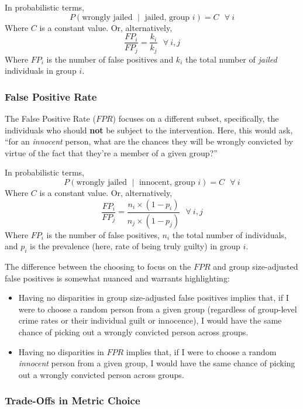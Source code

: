 \documentclass[]{krantz}
\begin{document}
In probabilistic terms,
\[P(\textrm{wrongly jailed $\mid$ jailed, group $i$}) = C~~~\forall~i\]
Where \(C\) is a constant value. Or, alternatively,
\[\frac{FP_i}{FP_j} = \frac{k_i}{k_j}~~~\forall~i,j\] Where \(FP_i\) is
the number of false positives and \(k_i\) the total number of
\emph{jailed} individuals in group \(i\).

\subsubsection{False Positive Rate}\label{false-positive-rate}

The False Positive Rate (\(FPR\)) focuses on a different subset,
specifically, the individuals who should \textbf{not} be subject to the
intervention. Here, this would ask, ``for an \emph{innocent} person,
what are the chances they will be wrongly convicted by virtue of the
fact that they're a member of a given group?''

In probabilistic terms,
\[P(\textrm{wrongly jailed $\mid$ innocent, group $i$}) = C~~~\forall~i\]
Where \(C\) is a constant value. Or, alternatively,
\[\frac{FP_i}{FP_j} = \frac{n_i \times (1-p_i)}{n_j \times (1-p_j)}~~~\forall~i,j\]
Where \(FP_i\) is the number of false positives, \(n_i\) the total
number of individuals, and \(p_i\) is the prevalence (here, rate of
being truly guilty) in group \(i\).

The difference between the choosing to focus on the \(FPR\) and group
size-adjusted false positives is somewhat nuanced and warrants
highlighting:

\begin{itemize}
\item
  Having no disparities in group size-adjusted false positives implies
  that, if I were to choose a random person from a given group
  (regardless of group-level crime rates or their individual guilt or
  innocence), I would have the same chance of picking out a wrongly
  convicted person across groups.
\item
  Having no disparities in \(FPR\) implies that, if I were to choose a
  random \emph{innocent} person from a given group, I would have the
  same chance of picking out a wrongly convicted person across groups.
\end{itemize}

\subsubsection{Trade-Offs in Metric
Choice}\label{trade-offs-in-metric-choice}
\end{document}
